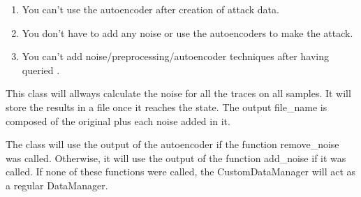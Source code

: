 \documentclass[letterpaper,10pt,english]{sphinxmanual}
\begin{document}
\begin{fulllineitems}
\begin{enumerate}
\item {} 
\sphinxAtStartPar
You can’t use the autoencoder after creation of attack data.

\item {} 
\sphinxAtStartPar
You don’t have to add any noise or use the autoencoders to make the attack.

\item {} 
\sphinxAtStartPar
You can’t add noise/preprocessing/autoencoder techniques after having queried .

\end{enumerate}

\sphinxAtStartPar
This class will allways calculate the noise for all the traces on all samples. It will
store the results in a  file once it reaches the  state.
The output file\_name is composed of the original  plus each noise added in it.

\sphinxAtStartPar
The class will use the output of the autoencoder if the function remove\_noise was called.
Otherwise, it will use the output of the function add\_noise if it was called. If none of these
functions were called, the CustomDataManager will act as a regular DataManager.


\end{fulllineitems}
\end{document}
